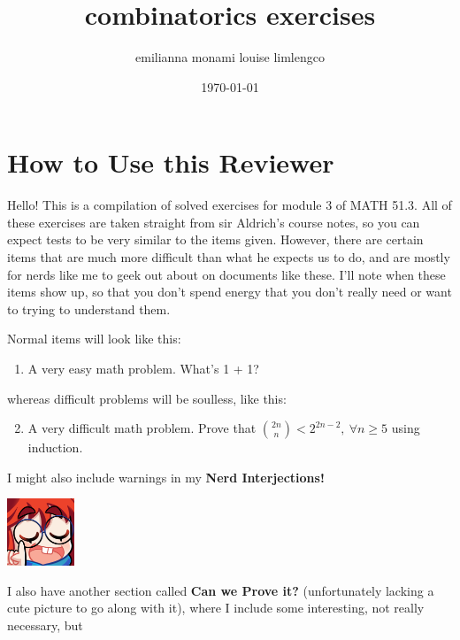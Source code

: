 \documentclass{article}
\title{combinatorics exercises}
\author{emilianna monami louise limlengco}
\date{\today}
\renewcommand{\labelenumi}{\colorbox{pink}{\textbf{\arabic{enumi}}}}
\begin{document}
\section*{How to Use this Reviewer}
Hello! This is a compilation of solved exercises for module 3 of MATH 51.3. All of these exercises are taken straight from sir Aldrich's course notes, so you can expect tests 
to be very similar to the items given. However, there are certain items that are much more difficult than what he expects us to do, and are mostly for nerds like me to geek out about 
on documents like these. I'll note when these items show up, so that you don't spend energy that you don't really need or want to trying to understand them.\par Normal items will look like this:\begin{enumerate} 
    \item A very easy math problem. What's 1 + 1?
\end{enumerate} 
whereas difficult problems will be soulless, like this:\begin{enumerate}\setcounter{enumi}{1}
    \renewcommand{\labelenumi}{\fcolorbox{magenta}{white}{\textbf{\arabic{enumi}}}}
    \item A very difficult math problem. Prove that $\displaystyle \binom{2n}{n} < 2^{2n-2},~\forall n \geq 5$ using induction. 
\end{enumerate} I might also include warnings in my \textbf{Nerd Interjections!}\par
\parindent=25pt \begin{minipage}[t]{.14\textwidth}
    \vspace{0pt}
    \includegraphics[width=2cm]{nerd_maddy.png} 
\end{minipage}%
\parindent=0pt \par I also have another section called \textbf{Can we Prove it?} (unfortunately lacking a cute picture to go along with it), where I include some interesting, not really necessary, but 
\end{document}
